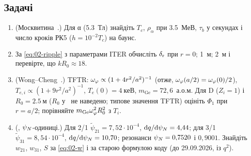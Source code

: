 \subsection*{Задачі}
\begin{enumerate}
  \item (Москвитина~\cite{Moskvitina2010}.) Для α (\SI{5,3}{Тл}) знайдіть $T_c$, $\rho_\alpha$ при \SI{3,5}{МеВ}, $\tau_b$ у секундах і число кроків РК5 ($h=10^{-2}T_c$) на баунс.
  \item За \eqref{eq:02-ripple} з параметрами ITER обчисліть $\delta_{\mathrm{r}}$ при $r=0$; \SI{1}{м}; \SI{2}{м} і перевірте, що $kR_0\approx18$.
  \item (Wong--Cheng~\cite{Wong1987}.) TFTR: $\omega_{\varphi}\propto(1+4r^2/a^2)^{-1}$ (отже, $\omega_{\varphi}(a/2)=\omega_{\varphi}(0)/2$), $T_{e,i}\propto(1+9r^2/a^2)^{-1}$, $T_e(0)=\SI{4}{кеВ}$, $m_{\mathrm{Ge}}=72{,}6$~а.о.м. Для D ($Z_i=1$) і $R_0=\SI{2,5}{м}$ ($R_0$ у~\cite{Wong1987} не наведено; типове значення TFTR) оцініть $\Phi_1$ при $r=a/2$; порівняйте $m_{\mathrm{Ge}}\omega_{\varphi}^2R_0^2$ з $T_i$.
  \item (\cite{ProjViz}, $\psi_{N}$-одиниці.) Для 2/1 $\tilde\psi_{21}=7{,}52\cdot10^{-4}$, $\mathrm{d} q/\mathrm{d}\psi_{N}=4{,}44$; для 3/1 $\tilde\psi_{31}=8{,}54\cdot10^{-4}$, $\mathrm{d} q/\mathrm{d}\psi_{N}=10{,}70$; резонанси $\psi_{N}=0{,}7520$ і $0{,}9001$. Знайдіть $w_{21}$, $w_{31}$, $S$ за \eqref{eq:02-w} і за старою формулою коду (до 29.09.2026, із $q^2$).
\end{enumerate}
